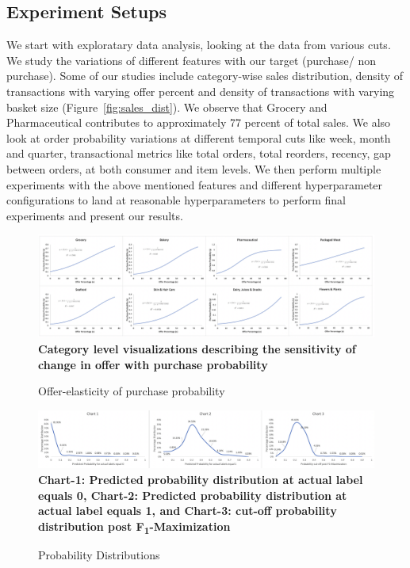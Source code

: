   \subsection{Experiment Setups}
We start with exploratary data analysis, looking at the data from various cuts. We
study the variations of different features with our target (purchase/ non purchase). Some of our studies include
category-wise sales distribution, density of transactions with varying offer percent 
and density of transactions with varying basket size (Figure~\ref{fig:sales_dist}).
We observe that Grocery and Pharmaceutical contributes to approximately 77 percent of total sales.
We also look at order probability variations at different temporal cuts like week, month and quarter, transactional metrics 
like total orders, total reorders, recency, gap between orders, at both consumer and item levels.
We then perform multiple experiments with the above mentioned features and different hyperparameter 
configurations to land at reasonable hyperparameters to perform final experiments and present our results.
  \begin{figure}[hbt!]
    \centering 
    \caption{Offer-elasticity of purchase probability} 
    \includegraphics[width=5.5in]{img/cat_curves.png} 
    \\ {\scriptsize \bf Category level visualizations describing the sensitivity of change in
    offer with purchase probability}
    \label{fig:cat_curves} 
  \end{figure}
 \begin{figure}[hbt!]
    \centering 
    \caption{Probability Distributions} 
    \includegraphics[width=5.5in]{img/prob_dist.png} 
    \\ {\scriptsize \bf Chart-1: Predicted probability distribution at actual label equals 0, 
    Chart-2:  Predicted probability distribution at actual label equals 1,
    and Chart-3: cut-off probability distribution post F\textsubscript{1}-Maximization}
    \label{fig:prob_dist} 
  \end{figure}
